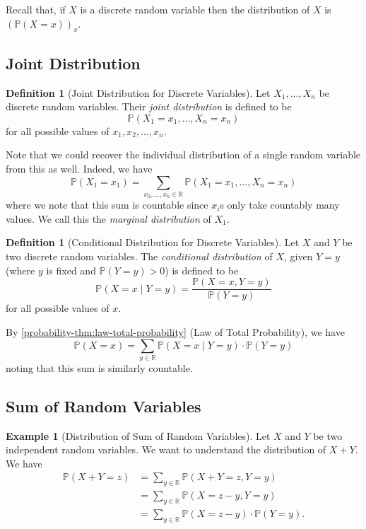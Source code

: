 \documentclass[11pt]{article}
\numberwithin{equation}{section}
\theoremstyle{definition}
\newtheorem{definition}[theorem]{Definition}
\newtheorem{example}[theorem]{Example}
\theoremstyle{remark}
\newcommand{\pqty}[1]{\left(#1\right)}
\newcommand{\RR}{\mathbb R}
\newcommand{\Prob}{\mathbb P}
\newcommand{\Conditional}[2]{#1\mid #2}
\begin{document}
Recall that, if \(X\) is a discrete random variable then the distribution of \(X\) is \(\pqty{\Prob\pqty{X = x}}_x\).

\subsection{Joint Distribution}

\begin{definition}[Joint Distribution for Discrete Variables]\label{probability-definition-031}
    \label{probability-def:joint-distribution-discrete}%
    Let \(X_1, \ldots, X_n\) be discrete random variables. Their \emph{joint distribution} is defined to be
    \[
        \Prob\pqty{X_1 = x_1, \ldots, X_n = x_n}
    \]
    for all possible values of \(x_1, x_2, \ldots, x_n\).
\end{definition}

Note that we could recover the individual distribution of a single random variable from this as well. Indeed, we have
\[
    \Prob\pqty{X_1 = x_1} = \sum_{x_2, \ldots, x_n \in \RR} \Prob\pqty{X_1 = x_1, \ldots, X_n = x_n}
\]
where we note that this sum is countable since \(x_i\)s only take countably many values. We call this the \emph{marginal distribution} of \(X_1\).

\begin{definition}[Conditional Distribution for Discrete Variables]\label{probability-definition-032}
    \label{probability-def:conditional-distribution-discrete}%
    Let \(X\) and \(Y\) be two discrete random variables. The \emph{conditional distribution} of \(X\), given \(Y = y\) (where \(y\) is fixed and \(\Prob(Y=y)>0\)) is defined to be
    \[
        \Prob\pqty{\Conditional{X = x}{Y = y}} = \frac{\Prob\pqty{X = x, Y = y}}{\Prob\pqty{Y = y}}
    \]
    for all possible values of \(x\).
\end{definition}

By \autoref{probability-thm:law-total-probability} (Law of Total Probability), we have
\[
    \Prob\pqty{X = x} = \sum_{y \in \RR} \Prob\pqty{\Conditional{X = x}{Y = y}} \cdot \Prob\pqty{Y = y}
\]
noting that this sum is similarly countable.

\subsection{Sum of Random Variables}

\begin{example}[Distribution of Sum of Random Variables]\label{probability-example-025}
    \label{probability-ex:distribution-sum-discrete}%
    Let \(X\) and \(Y\) be two independent random variables. We want to understand the distribution of \(X + Y\). We have
    \begin{align*}
        \Prob\pqty{X + Y = z} &= \sum_{y \in \RR} \Prob\pqty{X + Y = z, Y = y} \\
        &= \sum_{y \in \RR} \Prob\pqty{X = z - y, Y = y} \\
        &= \sum_{y \in \RR} \Prob\pqty{X = z - y} \cdot \Prob\pqty{Y = y}.
    \end{align*}
\end{example}
\end{document}

